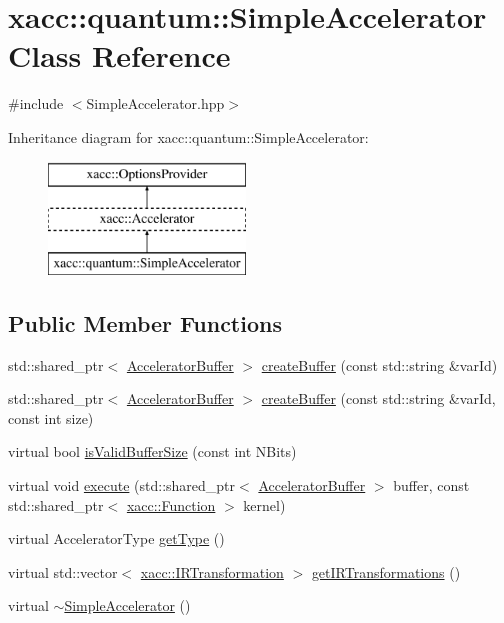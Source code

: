 \hypertarget{a00278}{}\section{xacc\+:\+:quantum\+:\+:Simple\+Accelerator Class Reference}
\label{a00278}


{\ttfamily \#include $<$Simple\+Accelerator.\+hpp$>$}

Inheritance diagram for xacc\+:\+:quantum\+:\+:Simple\+Accelerator\+:\begin{figure}[H]
\begin{center}
\leavevmode
\includegraphics[height=3.000000cm]{a00278}
\end{center}
\end{figure}
\subsection*{Public Member Functions}
\begin{DoxyCompactItemize}
\item 
std\+::shared\+\_\+ptr$<$ \hyperlink{a00032}{Accelerator\+Buffer} $>$ \hyperlink{a00278_a46445d77d4b8ad2689571d0db6604380}{create\+Buffer} (const std\+::string \&var\+Id)
\item 
std\+::shared\+\_\+ptr$<$ \hyperlink{a00032}{Accelerator\+Buffer} $>$ \hyperlink{a00278_adb9393692e9f484df241aa5d014030d1}{create\+Buffer} (const std\+::string \&var\+Id, const int size)
\item 
virtual bool \hyperlink{a00278_a60b9db2d6aed235857c45413a070338e}{is\+Valid\+Buffer\+Size} (const int N\+Bits)
\item 
virtual void \hyperlink{a00278_a3089b15fbbaa83abf2941bd3b8d2d3c6}{execute} (std\+::shared\+\_\+ptr$<$ \hyperlink{a00032}{Accelerator\+Buffer} $>$ buffer, const std\+::shared\+\_\+ptr$<$ \hyperlink{a00106}{xacc\+::\+Function} $>$ kernel)
\item 
virtual Accelerator\+Type \hyperlink{a00278_ad76eeb0bbd7de21aad5bd20d20970a98}{get\+Type} ()
\item 
virtual std\+::vector$<$ \hyperlink{a00168}{xacc\+::\+I\+R\+Transformation} $>$ \hyperlink{a00278_afc49c9e7973ba6c6ff9761c36198323d}{get\+I\+R\+Transformations} ()
\item 
virtual \hyperlink{a00278_a7ff286def924fafdff2066d12858e60c}{$\sim$\+Simple\+Accelerator} ()
\end{DoxyCompactItemize}
